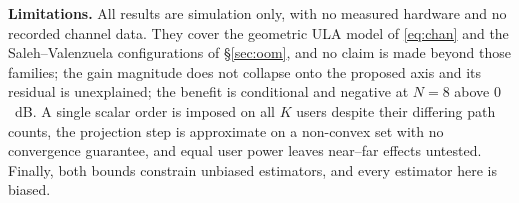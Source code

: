 \documentclass[journal]{IEEEtran}
\begin{document}
\textbf{Limitations.} All results are simulation only, with no measured
hardware and no recorded channel data. They cover the geometric ULA model of
\eqref{eq:chan} and the Saleh--Valenzuela configurations of \S\ref{sec:oom},
and no claim is made beyond those families; the gain magnitude does not
collapse onto the proposed axis and its residual is unexplained; the benefit
is conditional and negative at $N=8$ above $0$~dB. A single scalar order is
imposed on all $K$ users despite their differing path counts, the projection
step is approximate on a non-convex set with no convergence guarantee, and
equal user power leaves near--far effects untested. Finally, both bounds
constrain unbiased estimators, and every estimator here is biased.



\end{document}
